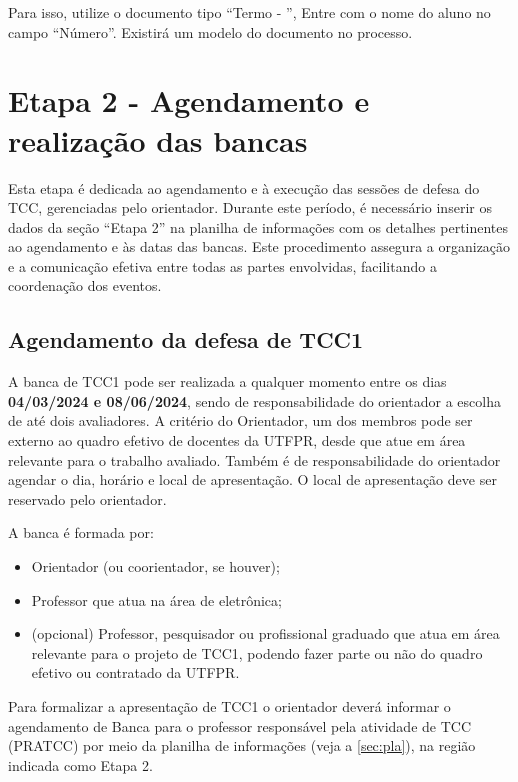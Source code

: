 \documentclass[a4paper, 12pt]{article}
\newcommand{\startdate}{04/03/2024}		%
\newcommand{\bancadate}{08/06/2024}		%
\begin{document}
	Para isso, utilize o documento tipo ``Termo - '', Entre com o nome do aluno no campo ``Número''. Existirá um modelo do documento no processo.


    \section{Etapa 2 - Agendamento e realização das bancas}
	\label{sec:et2}

	Esta etapa é dedicada ao agendamento e à execução das sessões de defesa do TCC, gerenciadas pelo orientador. Durante este período, é necessário inserir os dados da seção ``Etapa 2'' na planilha de informações com os detalhes pertinentes ao agendamento e às datas das bancas. Este procedimento assegura a organização e a comunicação efetiva entre todas as partes envolvidas, facilitando a coordenação dos eventos.
   	
	\subsection{Agendamento da defesa de TCC1}

    A banca de TCC1 pode ser realizada a qualquer momento entre os dias \textbf{\startdate{} e \bancadate{}}, sendo de responsabilidade do orientador a escolha de até dois avaliadores. A critério do Orientador, um dos membros pode ser externo ao quadro efetivo de docentes da UTFPR, desde que atue em área relevante para o trabalho avaliado. Também é de responsabilidade do orientador agendar o dia, horário e local de apresentação. O local de apresentação deve ser reservado pelo orientador.

	A banca é formada por:

	\begin{itemize}
		\item Orientador (ou coorientador, se houver);
		\item Professor que atua na área de eletrônica;
		\item (opcional) Professor, pesquisador ou profissional graduado que atua em área relevante para o projeto de TCC1,  podendo fazer parte ou não do quadro efetivo ou contratado da UTFPR.
	\end{itemize}
    
    Para formalizar a apresentação de TCC1 o orientador deverá informar o agendamento de Banca para o professor responsável pela atividade de TCC (PRATCC) por meio da planilha de informações (veja a \autoref{sec:pla}), na região indicada como Etapa 2.
    
\end{document}
